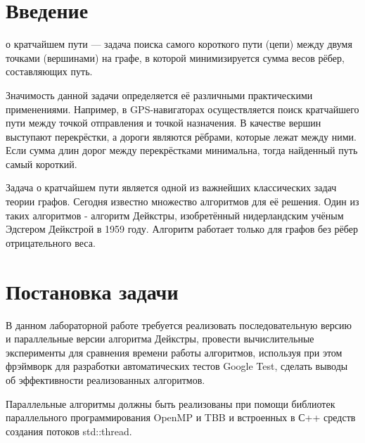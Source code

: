 \documentclass{report}
\begin{document}
\setcounter{page}{2}

\tableofcontents
\newpage

\section*{Введение}
 о кратчайшем пути — задача поиска самого короткого пути (цепи) между двумя точками (вершинами) на графе, в которой минимизируется сумма весов рёбер, составляющих путь.

Значимость данной задачи определяется её различными практическими применениями. Например, в GPS-навигаторах осуществляется поиск кратчайшего пути между точкой отправления и точкой назначения. В качестве вершин выступают перекрёстки, а дороги являются рёбрами, которые лежат между ними. Если сумма длин дорог между перекрёстками минимальна, тогда найденный путь самый короткий.

Задача о кратчайшем пути является одной из важнейших классических задач теории графов. Сегодня известно множество алгоритмов для её решения. Один из таких алгоритмов - алгоритм Дейкстры, изобретённый нидерландским учёным Эдсгером Дейкстрой в 1959 году. Алгоритм работает только для графов без рёбер отрицательного веса.
\newpage

\section*{Постановка задачи}
\par В данном лабораторной работе требуется реализовать последовательную версию и параллельные версии алгоритма Дейкстры, провести вычислительные эксперименты для сравнения времени работы алгоритмов, используя при этом фрэймворк для разработки автоматических тестов Google Test, сделать выводы об эффективности реализованных алгоритмов.
\par Параллельные алгоритмы должны быть реализованы при помощи библиотек параллельного программирования OpenMP и TBB и встроенных в С++ средств создания потоков std::thread.
\newpage

\end{document}
